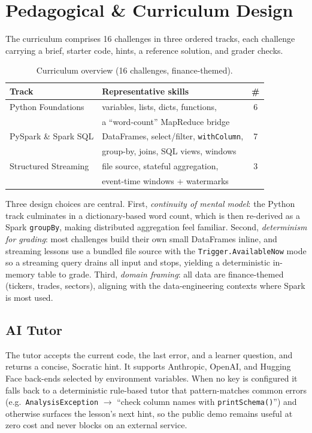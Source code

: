 \documentclass[10pt,twocolumn,letterpaper]{article}
\newcommand{\code}[1]{\texttt{\small #1}}
\begin{document}
\section{Pedagogical \& Curriculum Design}
\label{sec:curriculum}
The curriculum comprises 16 challenges in three ordered tracks, each challenge
carrying a brief, starter code, hints, a reference solution, and grader checks.

\begin{table}[t]
\centering
\caption{Curriculum overview (16 challenges, finance-themed).}
\label{tab:curriculum}
\small
\begin{tabular}{@{}llc@{}}
\toprule
\textbf{Track} & \textbf{Representative skills} & \textbf{\#} \\
\midrule
Python Foundations & variables, lists, dicts, functions, & 6 \\
 & a ``word-count'' MapReduce bridge & \\
PySpark \& Spark SQL & DataFrames, select/filter, \code{withColumn}, & 7 \\
 & group-by, joins, SQL views, windows & \\
Structured Streaming & file source, stateful aggregation, & 3 \\
 & event-time windows + watermarks & \\
\bottomrule
\end{tabular}
\end{table}

Three design choices are central. First, \emph{continuity of mental model}: the
Python track culminates in a dictionary-based word count, which is then re-derived
as a Spark \code{groupBy}, making distributed aggregation feel familiar. Second,
\emph{determinism for grading}: most challenges build their own small DataFrames
inline, and streaming lessons use a bundled file source with the
\code{Trigger.AvailableNow} mode so a streaming query drains all input and stops,
yielding a deterministic in-memory table to grade. Third, \emph{domain framing}:
all data are finance-themed (tickers, trades, sectors), aligning with the
data-engineering contexts where Spark is most used.

\subsection{AI Tutor}
\label{sec:tutor}
The tutor accepts the current code, the last error, and a learner question, and
returns a concise, Socratic hint. It supports Anthropic, OpenAI, and Hugging Face
back-ends selected by environment variables. When no key is configured it falls
back to a deterministic rule-based tutor that pattern-matches common errors
(e.g.\ \code{AnalysisException} $\rightarrow$ ``check column names with
\code{printSchema()}'') and otherwise surfaces the lesson's next hint, so the public
demo remains useful at zero cost and never blocks on an external service.
\end{document}
